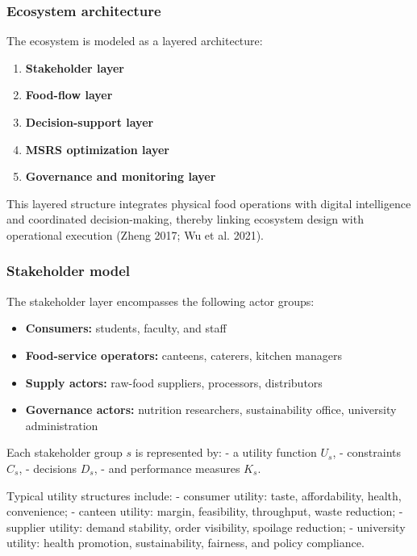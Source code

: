 \documentclass[
  letterpaper,
  DIV=11,
  numbers=noendperiod]{scrartcl}
\providecommand{\tightlist}{%
  \setlength{\itemsep}{0pt}\setlength{\parskip}{0pt}}
\begin{document}
\subsubsection{Ecosystem architecture}\label{ecosystem-architecture}

The ecosystem is modeled as a layered architecture:

\begin{enumerate}
\def\labelenumi{\arabic{enumi}.}
\tightlist
\item
  \textbf{Stakeholder layer}
\item
  \textbf{Food-flow layer}
\item
  \textbf{Decision-support layer}
\item
  \textbf{MSRS optimization layer}
\item
  \textbf{Governance and monitoring layer}
\end{enumerate}

This layered structure integrates physical food operations with digital
intelligence and coordinated decision-making, thereby linking ecosystem
design with operational execution (Zheng 2017; {Wu et al.} 2021).

\subsubsection{Stakeholder model}\label{stakeholder-model}

The stakeholder layer encompasses the following actor groups:

\begin{itemize}
\tightlist
\item
  \textbf{Consumers:} students, faculty, and staff
\item
  \textbf{Food-service operators:} canteens, caterers, kitchen managers
\item
  \textbf{Supply actors:} raw-food suppliers, processors, distributors
\item
  \textbf{Governance actors:} nutrition researchers, sustainability
  office, university administration
\end{itemize}

Each stakeholder group \(s\) is represented by: - a utility function
\(U_s\), - constraints \(C_s\), - decisions \(D_s\), - and performance
measures \(K_s\).

Typical utility structures include: - consumer utility: taste,
affordability, health, convenience; - canteen utility: margin,
feasibility, throughput, waste reduction; - supplier utility: demand
stability, order visibility, spoilage reduction; - university utility:
health promotion, sustainability, fairness, and policy compliance.
\end{document}
